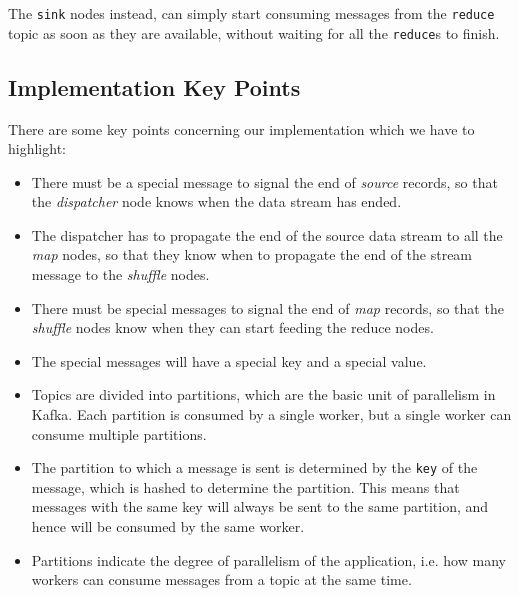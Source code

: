 The \texttt{sink} nodes instead, can simply start consuming messages from the \texttt{reduce} topic as soon as they are available, without waiting for all the \texttt{reduce}s to finish.

\subsection{Implementation Key Points}

There are some key points concerning our implementation which we have to highlight:
\begin{itemize}
   \item There must be a special message to signal the end of \textit{source} records, so that the \textit{dispatcher} node knows when the data stream has ended.
   \item The dispatcher has to propagate the end of the source data stream to all the \textit{map} nodes, so that they know when to propagate the end of the stream message to the \textit{shuffle} nodes.
   \item There must be special messages to signal the end of \textit{map} records, so that the \textit{shuffle} nodes know when they can start feeding the reduce nodes.
   \item The special messages will have a special key and a special value.
   \item Topics are divided into partitions, which are the basic unit of parallelism in Kafka. Each partition is consumed by a single worker, but a single worker can consume multiple partitions.
   \item The partition to which a message is sent is determined by the \texttt{key} of the message, which is hashed to determine the partition. This means that messages with the same key will always be sent to the same partition, and hence will be consumed by the same worker.
   \item Partitions indicate the degree of parallelism of the application, i.e. how many workers can consume messages from a topic at the same time.
\end{itemize} 

